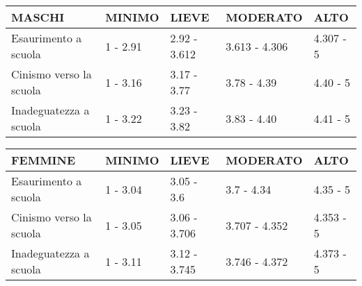 \setlength\arrayrulewidth{1pt}

\begin{table}[h!]
\def\arraystretch{1.5}
\begin{tabular}{| m{10em} | m{4.7em} | m{5em} | m{6.7em} | m{3.8em} |}
 \arrayrulecolor{Lines}\hline
 \rowcolor{Gray}
 \textbf{MASCHI} & \textbf{MINIMO} & \textbf{LIEVE} & \textbf{MODERATO} & \textbf{ALTO} \\
 \hline
 \cellcolor{None} Esaurimento a scuola & \cellcolor{Minimo} 1 - 2.91 & \cellcolor{Lieve} 2.92 - 3.612 & \cellcolor{Moderato} 3.613 - 4.306 & \cellcolor{Alto} 4.307 - 5 \\
 \hline
 \cellcolor{None} Cinismo verso la scuola & \cellcolor{Minimo} 1 - 3.16 & \cellcolor{Lieve} 3.17 - 3.77 & \cellcolor{Moderato} 3.78 - 4.39 & \cellcolor{Alto} 4.40 - 5 \\
 \hline
 \cellcolor{None} Inadeguatezza a scuola & \cellcolor{Minimo} 1 - 3.22 & \cellcolor{Lieve} 3.23 - 3.82 & \cellcolor{Moderato} 3.83 - 4.40 & \cellcolor{Alto} 4.41 - 5 \\
 \hline
\end{tabular}

\bigskip

\begin{tabular}{| m{10em} | m{4.7em} | m{5em} | m{6.7em} | m{3.8em} |}
 \arrayrulecolor{Lines}\hline
 \rowcolor{Gray}
 \textbf{FEMMINE} & \textbf{MINIMO} & \textbf{LIEVE} & \textbf{MODERATO} & \textbf{ALTO} \\
 \hline
 \cellcolor{None} Esaurimento a scuola & \cellcolor{Minimo} 1 - 3.04 & \cellcolor{Lieve} 3.05 - 3.6 & \cellcolor{Moderato} 3.7 - 4.34 & \cellcolor{Alto} 4.35 - 5 \\
 \hline
 \cellcolor{None} Cinismo verso la scuola & \cellcolor{Minimo} 1 - 3.05 & \cellcolor{Lieve} 3.06 - 3.706 & \cellcolor{Moderato} 3.707 - 4.352 & \cellcolor{Alto} 4.353 - 5 \\
 \hline
 \cellcolor{None} Inadeguatezza a scuola & \cellcolor{Minimo} 1 - 3.11 & \cellcolor{Lieve} 3.12 - 3.745 & \cellcolor{Moderato} 3.746 - 4.372 & \cellcolor{Alto} 4.373 - 5 \\
 \hline
\end{tabular}

\bigskip


\end{table}

